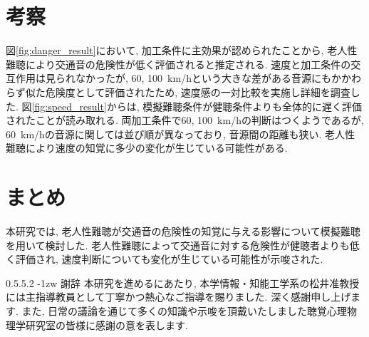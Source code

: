 \documentclass[10pt,twocolumn,uplatex,dvipdfmx]{jsarticle} %
\makeatletter
\renewcommand{\paragraph}{\@startsection{paragraph}{4}{\z@}%
    {\z@}{-1zw}%
    {\normalfont\normalsize\headfont}}
\renewcommand{\paragraph}{\@startsection{paragraph}{4}{\z@}%
    {0.5\Cvs \@plus.5\Cdp \@minus.2\Cdp}%
    {-1zw}%
    {\normalfont\normalsize\headfont}}
\makeatother
\begin{document}
\vspace{-8truemm}


\section{考察}

図\ref{fig:danger_result}において, 加工条件に主効果が認められたことから, 老人性難聴により交通音の危険性が低く評価されると推定される.
速度と加工条件の交互作用は見られなかったが, 60, 100~km/hという大きな差がある音源にもかかわらず似た危険度として評価されたため, 速度感の一対比較を実施し詳細を調査した.
図\ref{fig:speed_result}からは, 模擬難聴条件が健聴条件よりも全体的に遅く評価されたことが読み取れる. 両加工条件で60, 100~km/hの判断はつくようであるが,  60~km/hの音源に関しては並び順が異なっており, 音源間の距離も狭い. 老人性難聴により速度の知覚に多少の変化が生じている可能性がある.



\section{まとめ}

本研究では, 老人性難聴が交通音の危険性の知覚に与える影響について模擬難聴を用いて検討した. 老人性難聴によって交通音に対する危険性が健聴者よりも低く評価され, 速度判断についても変化が生じている可能性が示唆された.

\paragraph{謝辞}
 本研究を進めるにあたり, 本学情報・知能工学系の松井准教授には主指導教員として丁寧かつ熱心なご指導を賜りました. 深く感謝申し上げます. また, 日常の議論を通じて多くの知識や示唆を頂戴いたしました聴覚心理物理学研究室の皆様に感謝の意を表します.
\end{document}
